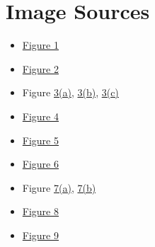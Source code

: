 \section{Image Sources}
\begin{minipage}{0.33\textwidth}
    \centering
    \begin{itemize}
        \item \href{https://www.pinterest.com/pin/250g-multicore-solder-38mm015-diameter-6337-370-flux-5core-mm01082--410672059781838162/}{Figure 1}
        \item \href{https://scienceprog.com/reliable-soldering-with-fluxes/}{Figure 2}
        \item Figure \href{https://www.amazon.com/Solder-Flux-Paste-grams-ounces/dp/B09DDCNJS9}{3(a)}, \href{https://www.amazon.com/Chipquik-Tack-clean-syringe-plunger/dp/B00CM2A97S}{3(b)}, \href{https://www.kester.com/products/product/951-flux-pen}{3(c)}
    \end{itemize}
\end{minipage}%
\begin{minipage}{0.33\textwidth}
    \centering
    \begin{itemize}
        \item \href{https://kb.hakkousa.com/Knowledgebase/10322/How-to-Maximize-Soldering-Iron-Tip-Life}{Figure 4}
        \item \href{https://hakkousa.com/599b-tip-cleaner.html}{Figure 5}
        \item \href{https://www.hakko.com/english/support/maintenance/detail.php?seq=183}{Figure 6}
    \end{itemize}
\end{minipage}%
\begin{minipage}{0.33\textwidth}
    \centering
    \begin{itemize}
        \item Figure \href{https://hakkousa.com/t18-d16-chisel-tip.html}{7(a)}, \href{https://hakkousa.com/t18-b-conical-tip.html}{7(b)}
        \item \href{https://llllllll.co/t/soldering-qs/3757}{Figure 8}
        \item \href{https://www.newark.com/techspray/1821-10f/desoldering-braid/dp/69K7664}{Figure 9}
    \end{itemize}
\end{minipage}
